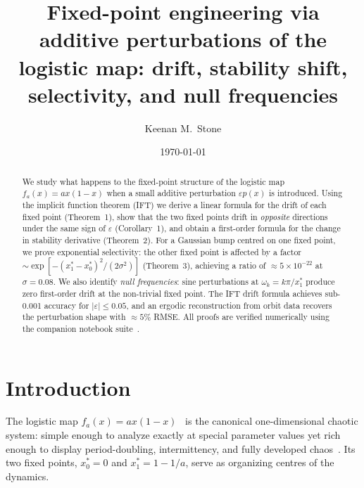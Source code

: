 \documentclass[aps,pre,twocolumn,superscriptaddress,nofootinbib,
               longbibliography,floatfix]{revtex4-2}
\newcommand{\eps}{\varepsilon}
\newcommand{\xsz}{x^*_0}
\newcommand{\xso}{x^*_1}
\theoremstyle{plain}
\theoremstyle{remark}
\begin{document}

\title{Fixed-point engineering via additive perturbations
       of the logistic map: drift, stability shift,
       selectivity, and null frequencies}

\author{Keenan M.~Stone}

\date{\today}

\begin{abstract}
We study what happens to the fixed-point structure of the
logistic map $f_a(x) = ax(1-x)$ when a small additive
perturbation $\eps p(x)$ is introduced.
Using the implicit function theorem (IFT) we derive a linear
formula for the drift of each fixed point (Theorem~1),
show that the two fixed points drift in \emph{opposite}
directions under the same sign of $\eps$ (Corollary~1),
and obtain a first-order formula for the change in stability
derivative (Theorem~2).
For a Gaussian bump centred on one fixed point, we prove
exponential selectivity: the other fixed point is affected by
a factor $\sim \exp[-(x^*_1 - x^*_0)^2/(2\sigma^2)]$
(Theorem~3), achieving a ratio of $\approx 5 \times 10^{-22}$
at $\sigma = 0.08$.
We also identify \emph{null frequencies}: sine perturbations at
$\omega_k = k\pi/x^*_1$ produce zero first-order drift at the
non-trivial fixed point.
The IFT drift formula achieves sub-0.001 accuracy for
$|\eps| \leq 0.05$, and an ergodic reconstruction from orbit
data recovers the perturbation shape with $\approx 5\%$ RMSE.
All proofs are verified numerically using the companion notebook
suite~\cite{PetrificationRepo}.
\end{abstract}


\maketitle

\section{Introduction}
\label{sec:intro}

The logistic map $f_a(x) = ax(1-x)$~\cite{May1976} is the
canonical one-dimensional chaotic system: simple enough to
analyze exactly at special parameter values yet rich enough to
display period-doubling, intermittency, and fully developed
chaos~\cite{Feigenbaum1978,Strogatz2015}.
Its two fixed points, $\xsz = 0$ and $\xso = 1 - 1/a$,
serve as organizing centres of the dynamics.
\end{document}
